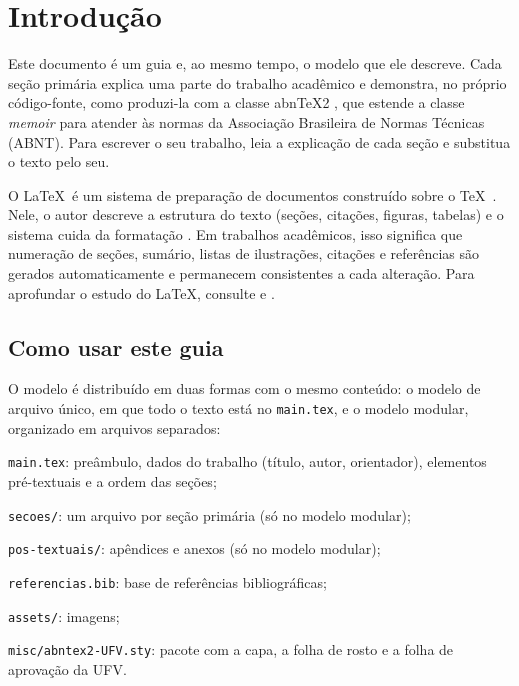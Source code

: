 \chapter{Introdução}\label{cap:introducao}

Este documento é um guia e, ao mesmo tempo, o modelo que ele descreve. Cada seção primária explica uma parte do trabalho acadêmico e demonstra, no próprio código-fonte, como produzi-la com a classe abn\TeX2 \cite{abntex2classe}, que estende a classe \textit{memoir} \cite{memoir} para atender às normas da Associação Brasileira de Normas Técnicas (ABNT). Para escrever o seu trabalho, leia a explicação de cada seção e substitua o texto pelo seu.

O \LaTeX\ é um sistema de preparação de documentos construído sobre o \TeX\ \cite{knuth1984texbook}. Nele, o autor descreve a estrutura do texto (seções, citações, figuras, tabelas) e o sistema cuida da formatação \cite{lamport1994}. Em trabalhos acadêmicos, isso significa que numeração de seções, sumário, listas de ilustrações, citações e referências são gerados automaticamente e permanecem consistentes a cada alteração. Para aprofundar o estudo do \LaTeX, consulte  e .

\section{Como usar este guia}\label{sec:como-usar}

O modelo é distribuído em duas formas com o mesmo conteúdo: o modelo de arquivo único, em que todo o texto está no \texttt{main.tex}, e o modelo modular, organizado em arquivos separados:

\begin{alineas}
	\item \texttt{main.tex}: preâmbulo, dados do trabalho (título, autor, orientador), elementos pré-textuais e a ordem das seções;
	\item \texttt{secoes/}: um arquivo por seção primária (só no modelo modular);
	\item \texttt{pos-textuais/}: apêndices e anexos (só no modelo modular);
	\item \texttt{referencias.bib}: base de referências bibliográficas;
	\item \texttt{assets/}: imagens;
	\item \texttt{misc/abntex2-UFV.sty}: pacote com a capa, a folha de rosto e a folha de aprovação da UFV.
\end{alineas}

